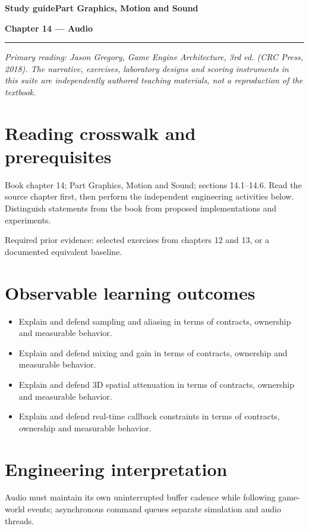 \documentclass[11pt,letterpaper]{article}
\newcommand{\DocType}{Reference}
\newcommand{\SuiteHeading}[3]{%
\renewcommand{\DocType}{#2}%
{\small\bfseries\sffamily\color{EngineTeal}#2\hfill #3}\par\vspace{6pt}
{\LARGE\bfseries\color{EngineBlue}#1}\par\vspace{4pt}
{\color{EngineTeal}\rule{\linewidth}{1pt}}\par\vspace{7pt}}
\newcommand{\SourceNote}{\footnotesize\textit{Primary reading: Jason Gregory, \emph{Game Engine Architecture}, 3rd ed. (CRC Press, 2018). The narrative, exercises, laboratory designs and scoring instruments in this suite are independently authored teaching materials, not a reproduction of the textbook.}\normalsize\par}
\begin{document}
\SuiteHeading{Chapter 14 — Audio}{Study guide}{Part Graphics, Motion and Sound}
\SourceNote
\section{Reading crosswalk and prerequisites}
Book chapter 14; Part Graphics, Motion and Sound; sections 14.1--14.6. Read the source chapter first, then perform the independent engineering activities below. Distinguish statements from the book from proposed implementations and experiments.

Required prior evidence: selected exercises from chapters 12 and 13, or a documented equivalent baseline.

\section{Observable learning outcomes}
\begin{itemize}
\item Explain and defend sampling and aliasing in terms of contracts, ownership and measurable behavior.
\item Explain and defend mixing and gain in terms of contracts, ownership and measurable behavior.
\item Explain and defend 3D spatial attenuation in terms of contracts, ownership and measurable behavior.
\item Explain and defend real-time callback constraints in terms of contracts, ownership and measurable behavior.
\end{itemize}
\section{Engineering interpretation}
Audio must maintain its own uninterrupted buffer cadence while following game-world events; asynchronous command queues separate simulation and audio threads.
\end{document}
